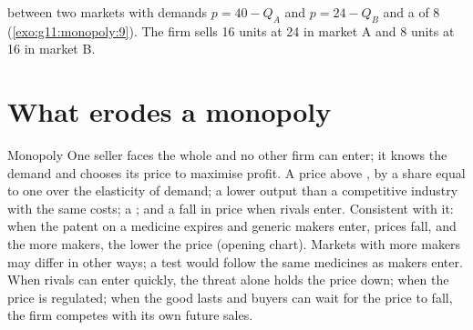 \begin{omfigure}

{\small {} between two markets with demands $p = 40 - Q_A$ and $p = 24 - Q_B$ and a  of 8 (\cref{exo:g11:monopoly:9}). The firm sells 16
units at 24 in market A and 8 units at 16 in market B.}
\end{omfigure}

\section{What erodes a monopoly}\label{sec:g11:monopoly:erosion}

\begin{model}{Monopoly}
\assumes One seller faces the whole  and no other firm can enter; it knows the demand and chooses its price to maximise profit.
\predicts A price above , by a share equal to one over the elasticity of demand; a lower output than a competitive industry with the same costs; a
  ; and a fall in price when rivals enter.
\tested Consistent with it: when the patent on a medicine expires and generic makers enter, prices fall, and the more makers, the lower the price (opening
  chart). Markets with more makers may differ in other ways; a test would follow the same medicines as makers enter.
\breaks When rivals can enter quickly, the threat alone holds the price down; when the price is regulated; when the good lasts and buyers can wait for the price to fall,
  the firm competes with its own future sales.
\end{model}


